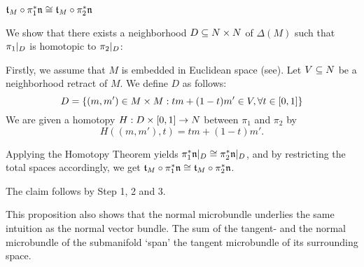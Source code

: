 \begin{myproof}
\begin{steps}
        \item $\mathfrak{t}_M \circ \pi_1^*\mathfrak{n} \cong \mathfrak{t}_M \circ \pi_2^*\mathfrak{n}$
        
        We show that there exists a neighborhood $D \subseteq{} N \times N$ of $\Delta(M)$ such that
        $\pi_1\vert_{D}$ is homotopic to $\pi_2\vert_{D}$:

        Firstly, we assume that $M$ is embedded in Euclidean space (see\cite[p.60]{dimension}).
        Let $V \subseteq{} N$ be a neighborhood retract of $M$.
        We define $D$ as follows:
        \[ D = \{(m, m') \in M \times M: tm + (1 - t)m' \in V, \forall t \in [0, 1]\} \]
        We are given a homotopy $H: D \times{} [0, 1] \to N$ between $\pi_1$ and $\pi_2$ by
        \[ H((m, m'), t) = tm + (1 - t)m'. \]

        Applying the Homotopy Theorem yields $\pi_1^*\mathfrak{n}\vert_{D} \cong \pi_2^*\mathfrak{n}\vert_{D}$, and
        by restricting the total spaces accordingly, we get
        $\mathfrak{t}_M \circ \pi_1^*\mathfrak{n} \cong \mathfrak{t}_M \circ \pi_2^*\mathfrak{n}$.
    \end{steps}
    The claim follows by Step 1, 2 and 3.
\end{myproof}

\begin{myparagraph}
    This proposition also shows that the normal microbundle
    underlies the same intuition as the normal vector bundle. 
    The sum of the tangent- and the normal microbundle of the submanifold
    `span' the tangent microbundle of its surrounding space.
\end{myparagraph}